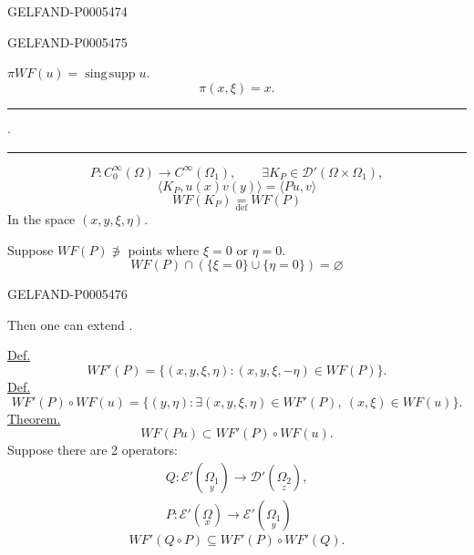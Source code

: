 \begin{GelfandAdjacentEvidence}{GELFAND-P000547}{4}

\end{GelfandAdjacentEvidence}
\begin{GelfandAdjacentEvidence}{GELFAND-P000547}{5}


\qquad
\(\pi WF(u)=\operatorname{sing\,supp}u\).
\[
\pi(x,\xi)=x.
\]
\hfill\rule{1.2cm}{.35pt}\enspace\(\cdot\)\enspace\rule{1.4cm}{.35pt}\par

\[
P:C_0^\infty(\Omega)\longrightarrow C^\infty(\Omega_1),\qquad
\exists K_P\in\mathcal D'(\Omega\times\Omega_1),
\]
\[
\langle K_P,u(x)v(y)\rangle=\langle Pu,v\rangle
\]
\[
WF(K_P)\underset{\mathrm{def}}{=}WF(P)
\]
In the space \((x,y,\xi,\eta)\).

Suppose \(WF(P)\not\ni\) points where \(\xi=0\) or \(\eta=0\).
\[
\boxed{WF(P)\cap(\{\xi=0\}\cup\{\eta=0\})=\varnothing}
\]
\end{GelfandAdjacentEvidence}
\begin{GelfandAdjacentEvidence}{GELFAND-P000547}{6}

Then one can extend .

\uline{Def.}
\[
WF'(P)=\{(x,y,\xi,\eta):(x,y,\xi,-\eta)\in WF(P)\}.
\]
\uline{Def.}
\[
WF'(P)\circ WF(u)=
\{(y,\eta):\exists(x,y,\xi,\eta)\in WF'(P),\ (x,\xi)\in WF(u)\}.
\]
\uline{Theorem.}
\[
WF(Pu)\subset WF'(P)\circ WF(u).
\]
Suppose there are 2 operators:
\begin{gather*}
Q:\mathcal E'(\underset{y}{\Omega_1})\longrightarrow
\mathcal D'(\underset{z}{\Omega_2}),\\
P:\mathcal E'(\underset{x}{\Omega})\longrightarrow
\mathcal E'(\underset{y}{\Omega_1})
\end{gather*}
\[
WF'(Q\circ P)\subseteq WF'(P)\circ WF'(Q).
\]
\end{GelfandAdjacentEvidence}
